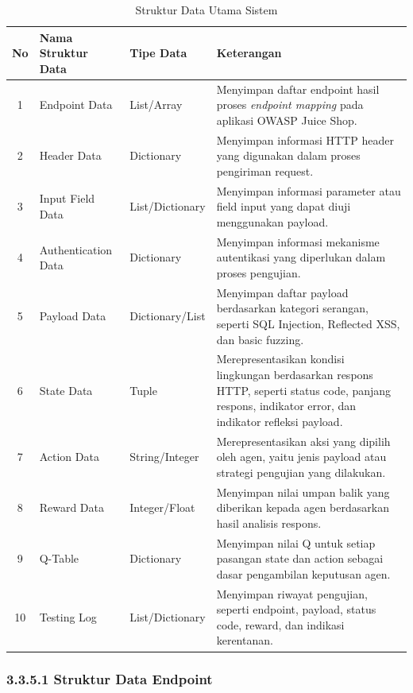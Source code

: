 \begin{table}[H]
\centering
\begin{tabular}{|c|l|l|p{6.5cm}|}
\hline
\textbf{No} & \textbf{Nama Struktur Data} & \textbf{Tipe Data} & \textbf{Keterangan} \\ \hline

1 & Endpoint Data & List/Array & Menyimpan daftar endpoint hasil proses \textit{endpoint mapping} pada aplikasi OWASP Juice Shop. \\ \hline
2 & Header Data & Dictionary & Menyimpan informasi HTTP header yang digunakan dalam proses pengiriman request. \\ \hline
3 & Input Field Data & List/Dictionary & Menyimpan informasi parameter atau field input yang dapat diuji menggunakan payload. \\ \hline
4 & Authentication Data & Dictionary & Menyimpan informasi mekanisme autentikasi yang diperlukan dalam proses pengujian. \\ \hline
5 & Payload Data & Dictionary/List & Menyimpan daftar payload berdasarkan kategori serangan, seperti SQL Injection, Reflected XSS, dan basic fuzzing. \\ \hline
6 & State Data & Tuple & Merepresentasikan kondisi lingkungan berdasarkan respons HTTP, seperti status code, panjang respons, indikator error, dan indikator refleksi payload. \\ \hline
7 & Action Data & String/Integer & Merepresentasikan aksi yang dipilih oleh agen, yaitu jenis payload atau strategi pengujian yang dilakukan. \\ \hline
8 & Reward Data & Integer/Float & Menyimpan nilai umpan balik yang diberikan kepada agen berdasarkan hasil analisis respons. \\ \hline
9 & Q-Table & Dictionary & Menyimpan nilai Q untuk setiap pasangan state dan action sebagai dasar pengambilan keputusan agen. \\ \hline
10 & Testing Log & List/Dictionary & Menyimpan riwayat pengujian, seperti endpoint, payload, status code, reward, dan indikasi kerentanan. \\ \hline

\end{tabular}
\caption{Struktur Data Utama Sistem}
\label{tab:struktur_data_utama}
\end{table}

\subsubsection{3.3.5.1 Struktur Data Endpoint}

